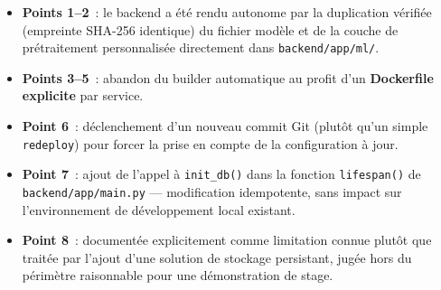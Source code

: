\begin{itemize}
  \item \textbf{Points 1--2}~: le backend a \'et\'e rendu autonome par la duplication v\'erifi\'ee (empreinte SHA-256 identique) du fichier mod\`ele et de la couche de pr\'etraitement personnalis\'ee directement dans \texttt{backend/app/ml/}.
  \item \textbf{Points 3--5}~: abandon du builder automatique au profit d'un \textbf{Dockerfile explicite} par service.
  \item \textbf{Point 6}~: d\'eclenchement d'un nouveau commit Git (plut\^ot qu'un simple \texttt{redeploy}) pour forcer la prise en compte de la configuration \`a jour.
  \item \textbf{Point 7}~: ajout de l'appel \`a \texttt{init\_db()} dans la fonction \texttt{lifespan()} de \texttt{backend/app/main.py} --- modification idempotente, sans impact sur l'environnement de d\'eveloppement local existant.
  \item \textbf{Point 8}~: document\'ee explicitement comme limitation connue plut\^ot que trait\'ee par l'ajout d'une solution de stockage persistant, jug\'ee hors du p\'erim\`etre raisonnable pour une d\'emonstration de stage.
\end{itemize}
